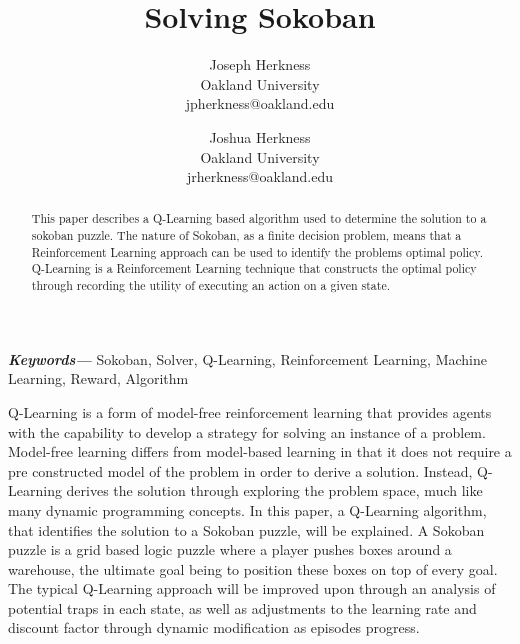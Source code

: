 \documentclass[times, 10pt,twocolumn]{article}
\begin{document}
\title{Solving Sokoban}

\author{Joseph Herkness\\
Oakland University\\
jpherkness@oakland.edu\\
\and
Joshua Herkness\\
Oakland University\\
jrherkness@oakland.edu\\
}

\maketitle
\thispagestyle{empty}

\begin{abstract}
   This paper describes a Q-Learning based algorithm used to determine the solution to a sokoban puzzle. The nature of Sokoban, as a finite decision problem, means that a Reinforcement Learning approach can be used to identify the problems optimal policy. Q-Learning is a Reinforcement Learning technique that constructs the optimal policy through recording the utility of executing an action on a given state. 
\end{abstract}

\providecommand{\keywords}[1]{\textbf{\textit{Keywords---}} #1}
\keywords{Sokoban, Solver, Q-Learning, Reinforcement Learning, Machine Learning, Reward, Algorithm}


Q-Learning is a form of model-free reinforcement learning that provides agents with the capability to develop a strategy for solving an instance of a problem. Model-free learning differs from model-based learning in that it does not require a pre constructed model of the problem in order to derive a solution. Instead, Q-Learning derives the solution through exploring the problem space, much like many dynamic programming concepts. In this paper, a Q-Learning algorithm, that identifies the solution to a Sokoban puzzle, will be explained. A Sokoban puzzle is a grid based logic puzzle where a player pushes boxes around a warehouse, the ultimate goal being to position these boxes on top of every goal. The typical Q-Learning approach will be improved upon through an analysis of potential traps in each state, as well as adjustments to the learning rate and discount factor through dynamic modification as episodes progress. 
\end{document}
